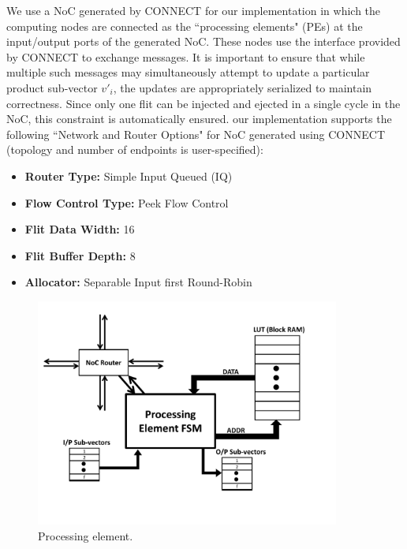 \documentclass[conference, 9pt]{IEEEtran}
\begin{document}
We use a NoC generated by CONNECT\cite{papamichael2012connect} for our implementation in which the computing nodes are connected as the ``processing elements" (PEs) at the input/output ports of the generated NoC. These nodes use the interface provided by CONNECT to exchange messages. It is important to ensure that while multiple such messages may simultaneously attempt to update a particular product sub-vector $v'_i$, the updates are appropriately serialized to maintain correctness. Since only one flit can be injected and ejected in a single cycle in the NoC, this constraint is automatically ensured. our implementation supports the following ``Network and Router Options" for NoC generated using CONNECT (topology and number of endpoints is user-specified):
\begin{itemize}
	\item \textbf{Router Type:} Simple Input Queued (IQ)
	\item \textbf{Flow Control Type:} Peek Flow Control
	\item \textbf{Flit Data Width:} 16
	\item \textbf{Flit Buffer Depth:} 8
	\item \textbf{Allocator:} Separable Input first Round-Robin
\end{itemize}


\begin{figure}[t!]
\centering
\includegraphics[scale=1, width=10cm]{figs/processing_element.pdf}
\caption{Processing element.}
\label{fig:pe}
\end{figure}
\end{document}
